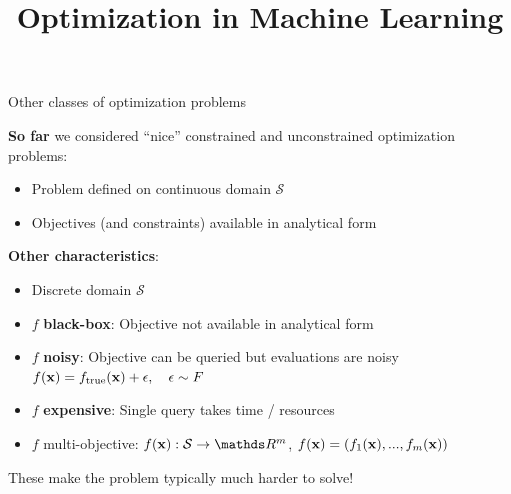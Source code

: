 \documentclass[11pt,compress,t,notes=noshow, xcolor=table]{beamer}
\title{Optimization in Machine Learning}
\date{}
\begin{document}
\sloppy

\begin{vbframe}{Other classes of optimization problems}

\textbf{So far} we considered \enquote{nice} constrained and unconstrained optimization problems: 

\begin{itemize}
	\item Problem defined on continuous domain $\mathcal{S}$
	\item Objectives (and constraints) available in analytical form
\end{itemize}

\lz 

\textbf{Other characteristics}: 
\begin{itemize}
	\item Discrete domain $\mathcal{S}$
	\item $f$ \textbf{black-box}: Objective not available in analytical form
	\item $f$ \textbf{noisy}: Objective can be queried but evaluations are noisy $f(\mathbf{x}) = f_{\text{true}}(\mathbf{x}) + \epsilon, \quad \epsilon \sim F$
	\item $f$ \textbf{expensive}: Single query takes time / resources
	\item $f$ multi-objective: $\fx: \mathcal{S} \to \R^m$, $f(\mathbf{x}) = \left(f_1(\mathbf{x}), ..., f_m(\mathbf{x})\right)$
\end{itemize}

\lz 

These make the problem typically much harder to solve!

\end{vbframe}
\end{document}
